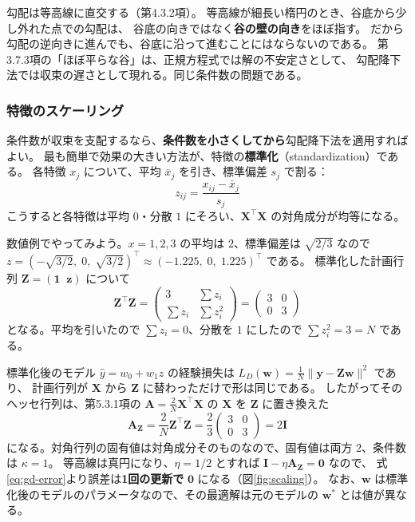 勾配は等高線に直交する（第4.3.2項）。
等高線が細長い楕円のとき、谷底から少し外れた点での勾配は、
谷底の向きではなく\textbf{谷の壁の向き}をほぼ指す。
だから勾配の逆向きに進んでも、谷底に沿って進むことにはならないのである。
第3.7.3項の「ほぼ平らな谷」は、正規方程式では解の不安定さとして、
勾配降下法では収束の遅さとして現れる。同じ条件数の問題である。

\subsubsection{特徴のスケーリング}

条件数が収束を支配するなら、\textbf{条件数を小さくしてから}勾配降下法を適用すればよい。
最も簡単で効果の大きい方法が、特徴の\textbf{標準化}（standardization）である。
各特徴 $x_j$ について、平均 $\bar{x}_j$ を引き、標準偏差 $s_j$ で割る：
\begin{equation}
  z_{ij} = \frac{x_{ij} - \bar{x}_j}{s_j}
  \label{eq:standardize}
\end{equation}
こうすると各特徴は平均 $0$・分散 $1$ にそろい、$\bm{X}^\top\bm{X}$ の対角成分が均等になる。

数値例でやってみよう。$x = 1, 2, 3$ の平均は $2$、標準偏差は $\sqrt{2/3}$ なので
$z = (-\sqrt{3/2},\; 0,\; \sqrt{3/2})^\top \approx (-1.225,\; 0,\; 1.225)^\top$ である。
標準化した計画行列 $\bm{Z} = (\bm{1}\;\; \bm{z})$ について
\begin{equation*}
  \bm{Z}^\top\bm{Z} = \begin{pmatrix} 3 & \sum z_i \\ \sum z_i & \sum z_i^2 \end{pmatrix}
                    = \begin{pmatrix} 3 & 0 \\ 0 & 3 \end{pmatrix}
\end{equation*}
となる。平均を引いたので $\sum z_i = 0$、分散を $1$ にしたので $\sum z_i^2 = 3 = N$ である。

標準化後のモデル $\hat{y} = w_0 + w_1 z$ の経験損失は $L_D(\bm{w}) = \frac{1}{N}\|\bm{y} - \bm{Z}\bm{w}\|^2$ であり、
計画行列が $\bm{X}$ から $\bm{Z}$ に替わっただけで形は同じである。
したがってそのヘッセ行列は、第5.3.1項の $\bm{A} = \frac{2}{N}\bm{X}^\top\bm{X}$ の $\bm{X}$ を $\bm{Z}$ に置き換えた
\begin{equation*}
  \bm{A}_{\bm{Z}} = \frac{2}{N}\bm{Z}^\top\bm{Z} = \frac{2}{3}\begin{pmatrix} 3 & 0 \\ 0 & 3 \end{pmatrix} = 2\bm{I}
\end{equation*}
になる。対角行列の固有値は対角成分そのものなので、固有値は両方 $2$、条件数は $\kappa = 1$。
等高線は真円になり、$\eta = 1/2$ とすれば $\bm{I} - \eta\bm{A}_{\bm{Z}} = \bm{0}$ なので、
式\eqref{eq:gd-error}より誤差は\textbf{1回の更新で} $\bm{0}$ になる（図\ref{fig:scaling}）。
なお、$\bm{w}$ は標準化後のモデルのパラメータなので、その最適解は元のモデルの $\bm{w}^*$ とは値が異なる。

